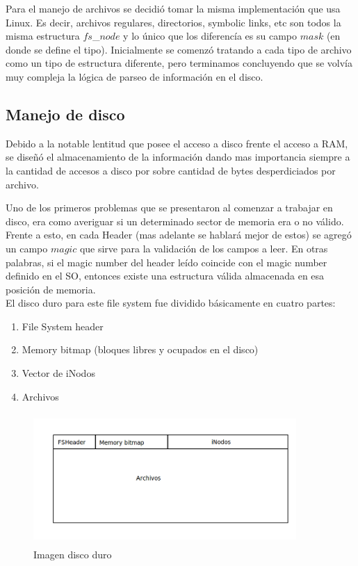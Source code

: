 \documentclass[english]{article}
\begin{document}
Para el manejo de archivos se decidió tomar la misma implementación
que usa Linux. Es decir, archivos regulares, directorios, symbolic
links, etc son todos la misma estructura $fs$\_$node$ y lo único
que los diferencía es su campo $mask$ (en donde se define el tipo).
Inicialmente se comenzó tratando a cada tipo de archivo como un tipo
de estructura diferente, pero terminamos concluyendo que se volvía
muy compleja la lógica de parseo de información en el disco.


\subsection{Manejo de disco}

Debido a la notable lentitud que posee el acceso a disco frente el
acceso a RAM, se diseñó el almacenamiento de la información dando
mas importancia siempre a la cantidad de accesos a disco por sobre
cantidad de bytes desperdiciados por archivo.

Uno de los primeros problemas que se presentaron al comenzar a trabajar
en disco, era como averiguar si un determinado sector de memoria era
o no válido. Frente a esto, en cada Header (mas adelante se hablará
mejor de estos) se agregó un campo $magic$ que sirve para la validación
de los campos a leer. En otras palabras, si el magic number del header
leído coincide con el magic number definido en el SO, entonces existe
una estructura válida almacenada en esa posición de memoria. \\


El disco duro para este file system fue dividido básicamente en cuatro
partes:
\begin{enumerate}
\item File System header
\item Memory bitmap (bloques libres y ocupados en el disco)
\item Vector de iNodos
\item Archivos
\end{enumerate}

\begin{figure}[H]
\begin{center}
\includegraphics[width=10cm,height=5cm,keepaspectratio]{Imagen_disco}

\caption{Imagen disco duro}
\end{center}
\end{figure}
\end{document}
